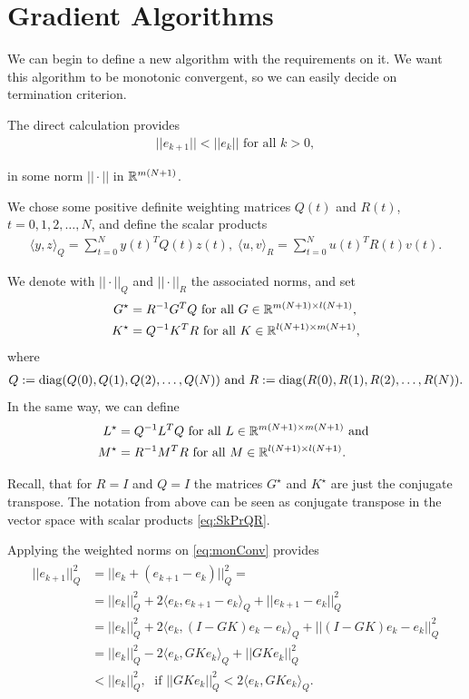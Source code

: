 \section{Gradient Algorithms}
We can begin to define a new algorithm with the requirements on it. We want this algorithm to be monotonic convergent, so we can easily decide on termination criterion. 

The direct calculation provides 
\begin{align}
\label{eq:monConv}
||e_{k+1}|| < ||e_k|| \text{ for all } k >0,
\end{align}

in some norm $|| \cdot || $ in ${\mathbb{R}}^{m(N+1)}$. 

We chose some positive definite weighting matrices $Q(t)$ and $R(t)$, $t = 0, 1, 2, \dots ,N$, and define the scalar products
\begin{align}
\label{eq:SkPrQR}
\langle y,z\rangle_Q = \sum_{t = 0}^N y(t)^TQ(t)z(t), \; \langle u,v\rangle_R = \sum_{t = 0}^N u(t)^T R(t) v(t).
\end{align}

We denote with $||\cdot||_Q$ and $||\cdot||_R$ the associated norms, and set
\begin{align*}
G^\star &= R^{-1} G^T Q \text{ for all } G \in {\mathbb{R}}^{m(N+1)\times l(N+1)},\\
K^\star &= Q^{-1} K^T R \text{ for all } K \in {\mathbb{R}}^{l(N+1)\times m(N+1)},
\end{align*}
where 
\begin{align}
Q := \operatorname*{diag}(Q(0), Q(1), Q(2) ,\dots, Q(N)) \text{ and } R:= \operatorname*{diag}(R(0), R(1), R(2), \dots, R(N)).
\end{align}
In the same way, we can define 
\begin{align}
L^\star &= Q^{-1} L^T Q \text{ for all } L \in {\mathbb{R}}^{m(N+1)\times m(N+1)} \text{ and }\\
M^\star &= R^{-1} M^T R \text{ for all } M \in {\mathbb{R}}^{l(N+1)\times l(N+1)}.
\end{align}

Recall, that for $R = I$ and $Q = I$ the matrices $G^\star$ and $K^\star$ are just the conjugate transpose. The notation from above can be seen as conjugate transpose in the vector space with scalar products \eqref{eq:SkPrQR}.

Applying the weighted norms on \eqref{eq:monConv} provides
\begin{align}
\begin{split}
||e_{k+1} ||_Q^2 &= ||e_k + (e_{k+1} - e_k)||_Q^2 = \\
& = ||e_k||_Q^2 + 2\langle e_k, e_{k+1} - e_k \rangle_Q + ||e_{k+1} - e_k||_Q^2\\
& = ||e_k||_Q^2 + 2\langle e_k, (I - G K ) e_k - e_k \rangle_Q + ||(I - GK) e_k - e_k||_Q^2 \\
& = ||e_k||_Q^2 - 2 \langle e_k, G K  e_k \rangle_Q + ||GK e_k||_Q^2\\
& < ||e_k||_Q^2, \; \text{ if } ||GK e_k||_Q^2 < 2 \langle e_k, GK e_k\rangle_Q. 
\end{split}
\end{align}

